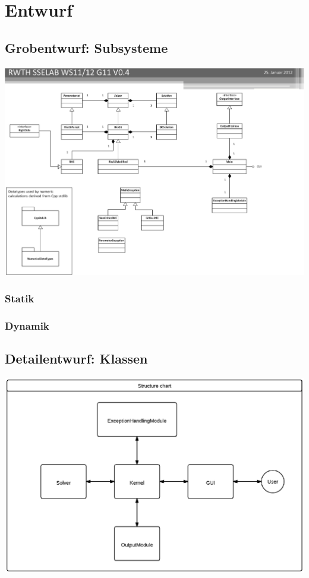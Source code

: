 \chapter{Entwurf}
\label{ch:3}

\section{Grobentwurf: Subsysteme}
\label{sec:3.1}
\includegraphics[width=6in,keepaspectratio=true]{figures/RWTH_SSELAB_WS1112_CLASSES.eps}

\subsection{Statik}

\subsection{Dynamik}

\section{Detailentwurf: Klassen}
\label{sec:3.2}
\includegraphics[width=6in,keepaspectratio=true]{figures/StructureDiagGyroSim.eps}

